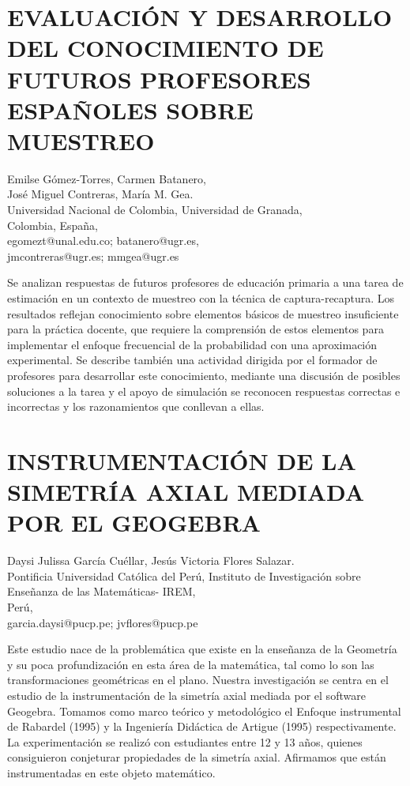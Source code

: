 \section{EVALUACIÓN Y DESARROLLO DEL CONOCIMIENTO DE FUTUROS PROFESORES ESPAÑOLES
SOBRE MUESTREO}

\begin{datos}
Emilse Gómez-Torres, Carmen Batanero, \\
José Miguel Contreras, María M. Gea.\\ 
Universidad Nacional de Colombia, Universidad de Granada,\\
Colombia, España,\\
\hfill  egomezt@unal.edu.co; batanero@ugr.es,\\
\hfill jmcontreras@ugr.es; mmgea@ugr.es
\end{datos}

Se analizan respuestas de futuros profesores de educación primaria
a una tarea de estimación en un contexto de muestreo con la técnica
de captura-recaptura. Los resultados reflejan conocimiento sobre elementos
básicos de muestreo insuficiente para la práctica docente, que requiere
la comprensión de estos elementos para implementar el enfoque frecuencial
de la probabilidad con una aproximación experimental. Se describe
también una actividad dirigida por el formador de profesores para
desarrollar este conocimiento, mediante una discusión de posibles
soluciones a la tarea y el apoyo de simulación se reconocen respuestas
correctas e incorrectas y los razonamientos que conllevan a ellas.


\section{INSTRUMENTACIÓN DE LA SIMETRÍA AXIAL MEDIADA POR EL GEOGEBRA}

\begin{datos}
Daysi Julissa García Cuéllar, Jesús Victoria Flores Salazar. \\
Pontificia Universidad Católica del Perú, Instituto de Investigación sobre Enseñanza de las Matemáticas- IREM,\\
\hfill Perú, \\
\hfill garcia.daysi@pucp.pe; jvflores@pucp.pe
\end{datos}

Este estudio nace de la problemática que existe en la enseñanza de
la Geometría y su poca profundización en esta área de la matemática,
tal como lo son las transformaciones geométricas en el plano. Nuestra
investigación se centra en el estudio de la instrumentación de la
simetría axial mediada por el software Geogebra. Tomamos como marco
teórico y metodológico el Enfoque instrumental de Rabardel (1995)
y la Ingeniería Didáctica de Artigue (1995) respectivamente. La experimentación
se realizó con estudiantes entre 12 y 13 años, quienes consiguieron
conjeturar propiedades de la simetría axial. Afirmamos que están instrumentadas
en este objeto matemático.


